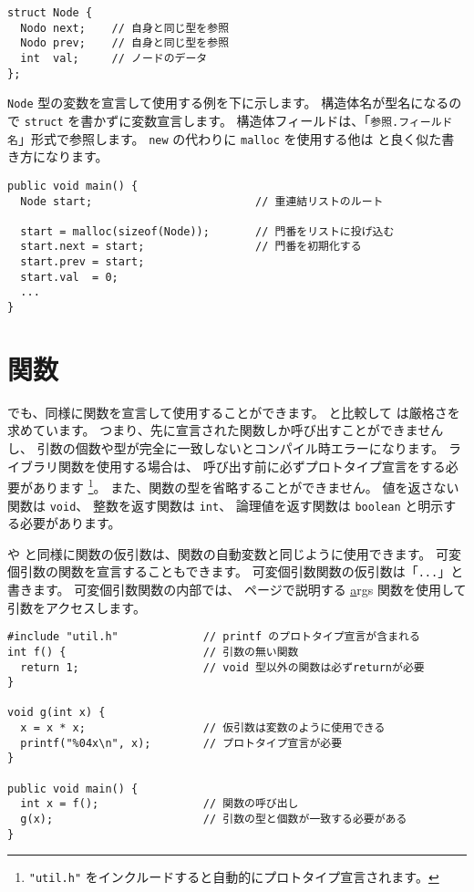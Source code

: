 \begin{mylist}
\begin{verbatim}
struct Node {
  Nodo next;    // 自身と同じ型を参照
  Nodo prev;    // 自身と同じ型を参照
  int  val;     // ノードのデータ
};
\end{verbatim}
\end{mylist}

\verb/Node/ 型の変数を宣言して使用する例を下に示します。
構造体名が型名になるので \verb/struct/ を書かずに変数宣言します。
構造体フィールドは、「\verb/参照.フィールド名/」形式で参照します。
\verb/new/ の代わりに \verb/malloc/ を使用する他は
\javal と良く似た書き方になります。

\begin{mylist}
\begin{verbatim}
public void main() {
  Node start;                         // 重連結リストのルート

  start = malloc(sizeof(Node));       // 門番をリストに投げ込む
  start.next = start;                 // 門番を初期化する
  start.prev = start;
  start.val  = 0;
  ...
}
\end{verbatim}
\end{mylist}

\section{関数}
\label{chap3:func}
\cmml でも、\cl 同様に関数を宣言して使用することができます。
\cl と比較して \cmml は厳格さを求めています。
つまり、先に宣言された関数しか呼び出すことができませんし、
引数の個数や型が完全に一致しないとコンパイル時エラーになります。
ライブラリ関数を使用する場合は、
呼び出す前に必ずプロトタイプ宣言をする必要があります
\footnote{
\verb/"util.h"/
をインクルードすると自動的にプロトタイプ宣言されます。}。
また、関数の型を省略することができません。
値を返さない関数は \verb/void/、
整数を返す関数は \verb/int/、
論理値を返す関数は \verb/boolean/ と明示する必要があります。

\cl や \javal と同様に関数の仮引数は、関数の自動変数と同じように使用できます。
可変個引数の関数を宣言することもできます。
可変個引数関数の仮引数は「\verb/.../」と書きます。
可変個引数関数の内部では、
\pageref{chap4:args}ページで説明する
\ul \ul args 関数を使用して引数をアクセスします。

\begin{mylist}
\begin{verbatim}
#include "util.h"             // printf のプロトタイプ宣言が含まれる
int f() {                     // 引数の無い関数
  return 1;                   // void 型以外の関数は必ずreturnが必要
}

void g(int x) {
  x = x * x;                  // 仮引数は変数のように使用できる
  printf("%04x\n", x);        // プロトタイプ宣言が必要
}

public void main() {
  int x = f();                // 関数の呼び出し
  g(x);                       // 引数の型と個数が一致する必要がある
}
\end{verbatim}
\end{mylist}

